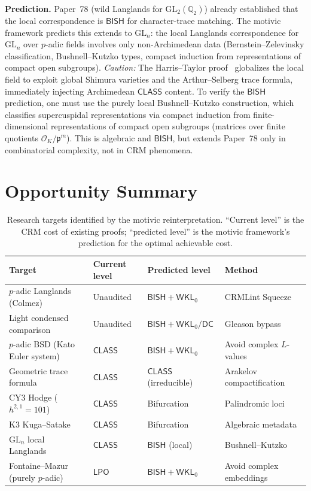 \documentclass[11pt,a4paper]{article}
\theoremstyle{plain}
\theoremstyle{definition}
\newcommand{\BISH}{\textsf{BISH}}
\newcommand{\WKL}{\textsf{WKL}_0}
\newcommand{\DC}{\textsf{DC}}
\newcommand{\LPO}{\textsf{LPO}}
\newcommand{\CLASS}{\textsf{CLASS}}
\newcommand{\Q}{\mathbb{Q}}
\newcommand{\GL}{\mathrm{GL}}
\begin{document}
\textbf{Prediction.} Paper~78 (wild Langlands for $\GL_2(\Q_2)$) already established that the local correspondence is $\BISH$ for character-trace matching. The motivic framework predicts this extends to $\GL_n$: the local Langlands correspondence for $\GL_n$ over $p$-adic fields involves only non-Archimedean data (Bernstein--Zelevinsky classification, Bushnell--Kutzko types, compact induction from representations of compact open subgroups). \emph{Caution:} The Harris--Taylor proof~\cite{harris-taylor01} globalizes the local field to exploit global Shimura varieties and the Arthur--Selberg trace formula, immediately injecting Archimedean $\CLASS$ content. To verify the $\BISH$ prediction, one must use the purely local Bushnell--Kutzko construction, which classifies supercuspidal representations via compact induction from finite-dimensional representations of compact open subgroups (matrices over finite quotients $\mathcal{O}_K / \mathfrak{p}^m$). This is algebraic and $\BISH$, but extends Paper~78 only in combinatorial complexity, not in CRM phenomena.

\section{Opportunity Summary}\label{app:summary}

\begin{table}[ht]
\centering
\small
\begin{tabular}{@{}llll@{}}
\toprule
\textbf{Target} & \textbf{Current level} & \textbf{Predicted level} & \textbf{Method} \\
\midrule
$p$-adic Langlands (Colmez) & Unaudited & $\BISH + \WKL$ & CRMLint Squeeze \\
Light condensed comparison & Unaudited & $\BISH + \WKL/\DC$ & Gleason bypass \\
$p$-adic BSD (Kato Euler system) & $\CLASS$ & $\BISH + \WKL$ & Avoid complex $L$-values \\
Geometric trace formula & $\CLASS$ & $\CLASS$ (irreducible) & Arakelov compactification \\
CY3 Hodge ($h^{2,1} = 101$) & $\CLASS$ & Bifurcation & Palindromic loci \\
K3 Kuga--Satake & $\CLASS$ & Bifurcation & Algebraic metadata \\
$\GL_n$ local Langlands & $\CLASS$ & $\BISH$ (local) & Bushnell--Kutzko \\
Fontaine--Mazur (purely $p$-adic) & $\LPO$ & $\BISH + \WKL$ & Avoid complex embeddings \\
\bottomrule
\end{tabular}
\caption{Research targets identified by the motivic reinterpretation. ``Current level'' is the CRM cost of existing proofs; ``predicted level'' is the motivic framework's prediction for the optimal achievable cost.}
\label{tab:opportunities}
\end{table}
\end{document}
